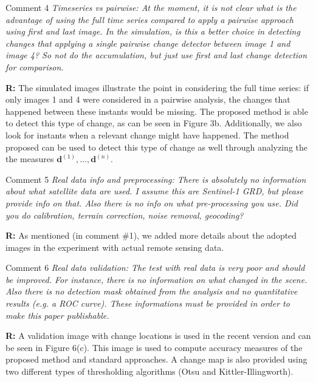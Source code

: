 \documentclass[11pt]{report}
\begin{document}
\medskip
\begin{mybox}{Comment 4}
\textit{Timeseries vs pairwise: At the moment, it is not clear what is the advantage of using the full time series
compared to apply a pairwise approach using first and last image. In the simulation, is this a better choice in
detecting changes that applying a single pairwise change detector between image 1 and image 4? So not do the
accumulation, but just use first and last change detection for comparison.}


\medskip
\textbf{R:} The simulated images illustrate the point in considering the full time series: if only images 1 and 4 were considered in a pairwise analysis, the changes that happened between these instants would be missing. The proposed method is able to detect this type of change, as can be seen in Figure 3b. Additionally, we also look for instants when a relevant change might have happened. The method proposed can be used to detect this type of change as well through analyzing the the measures $\mathbf{d}^{(1)},\ldots,\mathbf{d}^{(n)}$.
\end{mybox}

\medskip
\begin{mybox}{Comment 5}
\textit{Real data info and preprocessing: There is absolutely no information about what satellite data are used. I
assume this are Sentinel-1 GRD, but please provide info on that. Also there is no info on what pre-processing
you use. Did you do calibration, terrain correction, noise removal, geocoding?}


\medskip
\textbf{R:} As mentioned (in comment \#1), we added more details about the adopted images in the experiment with actual remote sensing data.


\end{mybox}

\medskip
\begin{mybox}{Comment 6}
\textit{Real data validation: The test with real data is very poor and should be improved. For instance, there is
no information on what changed in the scene. Also there is no detection mask obtained from the analysis and
no quantitative results (e.g. a ROC curve). These informations must be provided in order to make this paper
publishable.}


\medskip
\textbf{R:} A validation image with change locations is used in the recent version and can be seen in Figure 6(c). This image is used to compute accuracy measures of the proposed method and standard approaches. A change map is also provided using two different types of thresholding algorithms (Otsu and Kittler-Illingworth).
\end{mybox}
\end{document}
